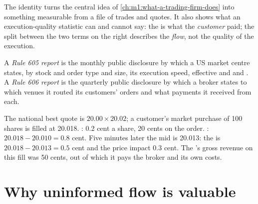 The identity turns the central idea of \cref{ch:m1:what-a-trading-firm-does}
into something measurable from a file of trades and quotes. It also shows
what an execution-quality statistic can and cannot say: the 
is what the \emph{customer} paid; the split between the two terms on the
right describes the \emph{flow}, not the quality of the execution.

\begin{definition}\label{def:m1:retail-flow-and-wholesaling:reports}
A \emph{Rule 605 report} is the monthly public
disclosure by which a US market centre states, by stock and order type and
size, its execution speed, effective and  and . A \emph{Rule 606 report} is the quarterly
public disclosure by which a broker states to which venues it routed its
customers' orders and what payments it received from each.
\end{definition}

\begin{example}\label{ex:m1:retail-flow-and-wholesaling:onefill}
The national best quote is $20.00 \times 20.02$; a customer's market purchase
of 100 shares is filled at 20.018. : 0.2 cent a share, 20
cents on the order. : $20.018 - 20.010 = 0.8$ cent.
Five minutes later the mid is 20.013: the  is $20.018 -
20.013 = 0.5$ cent and the price impact 0.3 cent. The 's gross
revenue on this fill was 50 cents, out of which it pays the broker and its
own costs.
\end{example}

\section{Why uninformed flow is valuable}

